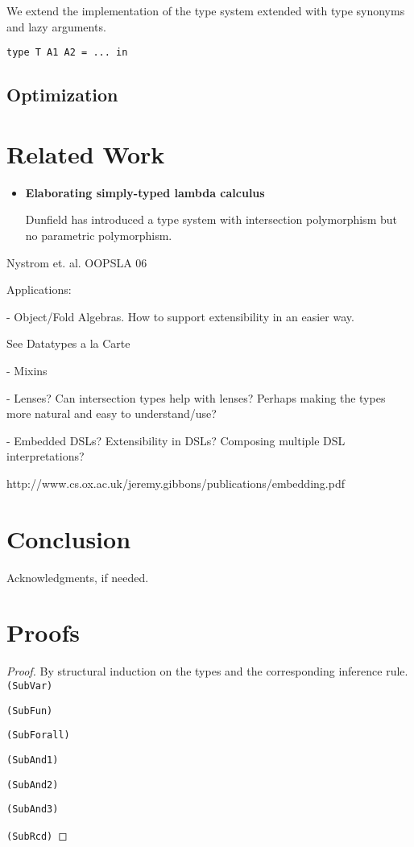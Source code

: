 \documentclass[preprint]{sigplanconf}
\begin{document}
We extend the implementation of the type system extended with type synonyms and
lazy arguments.

\begin{lstlisting}
type T A1 A2 = ... in
\end{lstlisting}

\subsection{Optimization}
\section{Related Work}

\begin{itemize}

\item{\bf Elaborating simply-typed lambda calculus}

  Dunfield has introduced a type system with intersection polymorphism but no
  parametric polymorphism.

\end{itemize}

Nystrom et. al. OOPSLA 06

Applications:

- Object/Fold Algebras. How to support extensibility in an easier way.

See Datatypes a la Carte

- Mixins

- Lenses? Can intersection types help with lenses? Perhaps making the
types more natural and easy to understand/use?

- Embedded DSLs? Extensibility in DSLs? Composing multiple DSL interpretations?

http://www.cs.ox.ac.uk/jeremy.gibbons/publications/embedding.pdf

\section{Conclusion}


Acknowledgments, if needed.

\appendix

\section{Proofs}

\begin{proof}
By structural induction on the types and the corresponding inference rule. \\

\texttt{(SubVar)}

\texttt{(SubFun)}

\texttt{(SubForall)}

\texttt{(SubAnd1)}

\texttt{(SubAnd2)}

\texttt{(SubAnd3)}

\texttt{(SubRcd)}

\end{proof}
\end{document}
